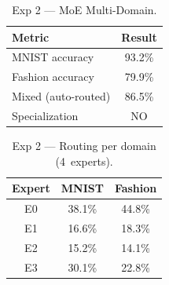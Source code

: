\begin{table}[h!]
\centering
\caption{Exp 2 --- MoE Multi-Domain.}
\begin{tabular}{l c}
\hline
\textbf{Metric} & \textbf{Result} \\
\hline
MNIST accuracy & 93.2\% \\
Fashion accuracy & 79.9\% \\
Mixed (auto-routed) & 86.5\% \\
Specialization & NO \\
\hline
\end{tabular}
\label{tab:cpu_exp2}
\end{table}

\begin{table}[h!]
\centering
\caption{Exp 2 --- Routing per domain (4~experts).}
\begin{tabular}{c c c}
\hline
\textbf{Expert} & \textbf{MNIST} & \textbf{Fashion} \\
\hline
E0 & 38.1\% & 44.8\% \\
E1 & 16.6\% & 18.3\% \\
E2 & 15.2\% & 14.1\% \\
E3 & 30.1\% & 22.8\% \\
\hline
\end{tabular}
\label{tab:cpu_exp2_routing}
\end{table}
